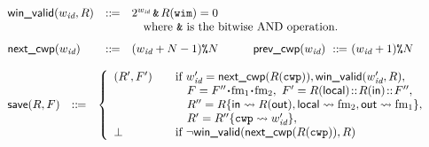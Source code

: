 \begin{figure}[!t]
\[\begin{array}{l}
        \begin{array}{lcl}
            \winvalid(\cwp, \RFile) & \define & 2^{\cwp}
											\,\bitAND\, \RFile(\regwim) = 0								
			\\
             & & \ \ \ \mbox{where $\bitAND$ is the bitwise AND operation.}
            \\
            \\[-5pt]
		    \precwp(\cwp) & \define & (\cwp + N - 1) \modOP N
            \qquad\quad
		    \postcwp(\cwp) \ \define \ (\cwp + 1) \modOP N
        \end{array}
            \\
		    \\ %
        \begin{array}{lcl}
            \decwin(\RFile, \Wstack) & \define &
            \left\{
            \begin{array}{ll}
                (\RFile', \Wstack')
                & \quad \text{if }
                             \cwp' = \precwp(\RFile(\regcwp)),
                             \winvalid(\cwp', \RFile), \\
                & \quad \ \ \
                             \Wstack = \Wstack'' \lstApp \fm_1 \lstApp \fm_2, \
                              \Wstack' = \RFile(\localRN)
                                          \stCons\RFile(\inRN)\stCons\Wstack'',\\
                & \quad \ \ \ \RFile'' =
                \RFile\{\inRN\rightsquigarrow \RFile(\outRN),
                        \localRN\rightsquigarrow \fm_2,
                        \outRN \rightsquigarrow \fm_1\},
                \\
                 & \quad \ \ \
                            \RFile' = \fsubst{\RFile''}\regcwp{\cwp'},
                 \\
                \perp &\quad \text{if }
                                  \lnot\winvalid(\precwp(R(\regcwp)), \RFile)
            \end{array}
            \right. \\
            \\[-8pt]


\end{array}
\end{array}\]
\end{figure}
